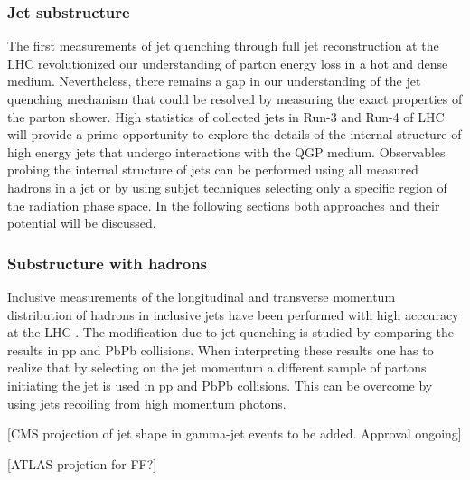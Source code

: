 \subsubsection{Jet substructure}
The first measurements of jet quenching through full jet reconstruction at the LHC revolutionized our understanding of parton energy loss in a hot and dense medium. Nevertheless, there remains a gap in our understanding of the jet quenching mechanism that could be resolved by measuring the exact properties of the parton shower. High statistics of collected jets in Run-3 and Run-4 of LHC will provide a prime opportunity to explore the details of the internal structure of high energy jets that undergo interactions with the QGP medium. Observables probing the internal structure of jets can be performed using all measured hadrons in a jet or by using subjet techniques selecting only a specific region of the radiation phase space. In the following sections both approaches and their potential will be discussed.

\subsubsection{Substructure with hadrons}
Inclusive measurements of the longitudinal and transverse momentum distribution of hadrons in inclusive jets have been performed with high acccuracy at the LHC \cite{Aaboud:2018hpb,Sirunyan:2018jqr}. The modification due to jet quenching is studied by comparing the results in pp and PbPb collisions. When interpreting these results one has to realize that by selecting on the jet momentum a different sample of partons initiating the jet is used in pp and PbPb collisions. This can be overcome by using jets recoiling from high momentum photons. 

[CMS projection of jet shape in gamma-jet events to be added. Approval ongoing]

[ATLAS projetion for FF?]


